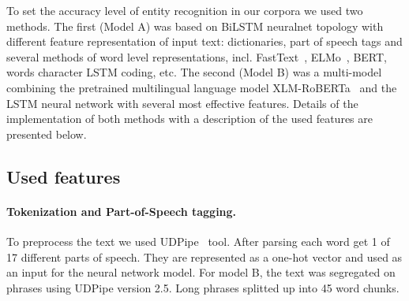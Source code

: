 \documentclass[a4paper,fleqn,longmktitle]{cas-dc}
\begin{document}


To set the accuracy level of entity recognition in our corpora we used two methods. The first (Model A) was based on BiLSTM neuralnet topology with different feature representation of input text: dictionaries, part of speech tags and several methods of word level representations, incl. FastText~\cite{bojanowski2017enriching}, ELMo~\cite{peters2018deep}, BERT, words character LSTM coding, etc. 
The second (Model B) was a multi-model combining the  pretrained multilingual language model XLM-RoBERTa~\cite{xlm_conneau2019unsupervised} and the LSTM neural network  with several most effective features. 
Details of the implementation of both methods with a description of the used features are presented below. 

\subsection{Used features}\label{subsubsec:features} %
\paragraph{Tokenization and Part-of-Speech tagging.} 
To preprocess the text we used UDPipe~\cite{straka2016udpipe} tool. After parsing each word get 1 of 17 different parts of speech. They are represented as a one-hot vector and used as an input for the neural network model. For model B, the text was segregated on phrases using UDPipe version 2.5. Long phrases splitted up into 45 word chunks.
\end{document}
